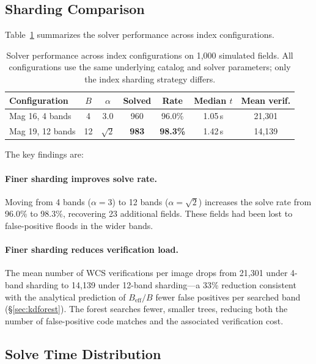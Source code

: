 \documentclass[twocolumn, 10pt]{article}
\begin{document}
\subsection{Sharding Comparison} \label{sec:comparison}

Table~\ref{tab:results} summarizes the solver performance across
index configurations.

\begin{table}[t]
\centering
\caption{Solver performance across index configurations on 1{,}000
simulated fields. All configurations use the same underlying catalog
and solver parameters; only the index sharding strategy differs.
\label{tab:results}}
\begin{tabular}{@{}lcccccc@{}}
\toprule
Configuration & $B$ & $\alpha$ & Solved & Rate & Median $t$ & Mean verif. \\
\midrule
Mag 16, 4 bands          & 4  & 3.0          & 960  & 96.0\% & 1.05\,s & 21{,}301 \\
Mag 19, 12 bands         & 12 & $\sqrt{2}$   & \textbf{983} & \textbf{98.3\%} & 1.42\,s & 14{,}139 \\
\bottomrule
\end{tabular}
\end{table}

The key findings are:

\paragraph{Finer sharding improves solve rate.}
Moving from 4 bands ($\alpha = 3$) to 12 bands ($\alpha = \sqrt{2}$)
increases the solve rate from 96.0\% to 98.3\%, recovering 23
additional fields. These fields had been lost to false-positive floods
in the wider bands.

\paragraph{Finer sharding reduces verification load.}
The mean number of WCS verifications per image drops from 21{,}301
under 4-band sharding to 14{,}139 under 12-band sharding---a 33\%
reduction consistent with the analytical prediction of
$B_{\text{eff}}/B$ fewer false positives per searched band
(\S\ref{sec:kdforest}). The forest searches fewer, smaller trees,
reducing both the number of false-positive code matches and the
associated verification cost.

\subsection{Solve Time Distribution} \label{sec:timedist}
\end{document}
